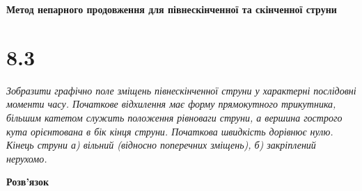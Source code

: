 


%


\textbf{\large Метод непарного продовження для півнескінченної та скінченної струни}

\section[Задача №8.3]{8.3}

\textit{Зобразити графічно поле зміщень півнескінченної струни у характерні послідовні моменти часу. Початкове відхилення має форму прямокутного трикутника, більшим катетом служить положення рівноваги струни, а вершина гострого кута орієнтована в бік кінця струни. Початкова швидкість дорівнює нулю. Кінець струни а) вільний (відносно поперечних зміщень), б) закріплений нерухомо.}

\begin{center}
    \large{\textbf{Розв'язок}}
\end{center}


